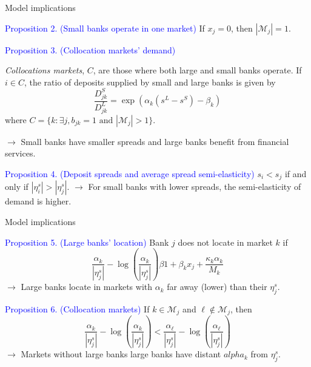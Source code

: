 \documentclass[notes,10pt, aspectratio=169]{beamer}
\newenvironment{wideitemize}{\itemize\addtolength{\itemsep}{10pt}}{\enditemize}
\begin{document}
\begin{frame}{Model implications}
            
    \begin{wideitemize}

        \item  \textcolor{blue}{Proposition 2. (Small banks operate in one market)}   If $x_j=0$, then $\left|\mathcal{M}_j\right|=1$.

        \item \textcolor{blue}{Proposition 3. (Collocation markets' demand)}  
        
        \textit{Collocations markets}, $C$, are those where both large and small banks operate.
 If $i \in C$, the ratio of deposits supplied by small and large banks is given by
        $$ \frac{D_{jk}^S}{D_{jk}^L} = \exp(\alpha_k (s^L - s^S) - \beta_k)$$ 
 where $C = \{k: \exists j, b_{jk}=1 \text{ and } |\mathcal{M}_j|>1\}$.

        $\rightarrow$ Small banks have smaller spreads and large banks benefit from financial services.

        \pause 
        \item  \textcolor{blue}{Proposition 4. (Deposit spreads and average spread semi-elasticity)} $s_i < s_j$ if and only if $|\eta_i^s| > |\eta_j^s|$.
        $\rightarrow$ For small banks with lower spreads, the semi-elasticity of demand is higher.
    \end{wideitemize}
\end{frame}

\begin{frame}{Model implications}
            
    \begin{wideitemize}

        \item \textcolor{blue}{Proposition 5. (Large banks' location)} Bank $j$ does not locate in market $k$ if
        $$
        \frac{\alpha_k}{\left|\eta_j^s\right|}-\log \left(\frac{\alpha_k}{\left|\eta_j^s\right|}\right) \beta 1+\beta_k x_j+\frac{\kappa_k \alpha_k}{M_k}
        $$
        $\rightarrow$ Large banks locate in markets with $\alpha_k$ far away (lower) than their $\eta_j^s$.
        \pause
        \item \textcolor{blue}{Proposition 6. (Collocation markets)} If $k \in \mathcal{M}_j$ and $\ell \notin \mathcal{M}_j$, then 
        $$
        \frac{\alpha_k}{\left|\eta_j^s\right|}-\log \left(\frac{\alpha_k}{\left|\eta_j^s\right|}\right)<\frac{\alpha_{\ell}}{\left|\eta_j^s\right|}-\log \left(\frac{\alpha_{\ell}}{\left|\eta_j^s\right|}\right)
        $$
        $\rightarrow$ Markets without large banks large banks have distant $alpha_k$ from $\eta_j^s$.
    \end{wideitemize}
    \end{frame}
  
\end{document}
